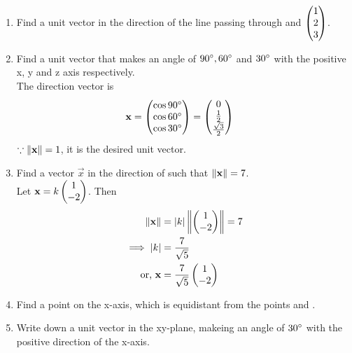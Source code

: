 \documentclass[journal,12pt,twocolumn]{IEEEtran}
\renewcommand\thesection{\arabic{section}}
\begin{document}
\begin{enumerate}[label=\thesection.\arabic*.,ref=\thesection.\theenumi]
%
%



\item Find a unit vector in the direction of the line passing through  and $\begin{pmatrix}1\\2\\3\end{pmatrix}$.
%
\\
\solution
%
\item Find a unit vector that makes an angle of $90\degree, 60\degree$ and $30\degree$ with the positive x, y and z axis respectively.
%
\\
\solution
The direction vector is
%
\begin{align}
\label{eq:line_dir_cos}
\mathbf{x} &= \begin{pmatrix}\cos 90\degree\\\cos 60\degree \\ \cos 30\degree\end{pmatrix} = \begin{pmatrix}0 \\ \frac{1}{2}\\\frac{\sqrt{3}}{2}\end{pmatrix}
\end{align}
%
$\because \left\lVert\mathbf{x}\right\rVert=1$, it is the desired unit vector.
\item Find a vector $\vec{x}$ in the direction of  such that $\left\lVert\mathbf{x}\right\rVert = 7$.
\\
\solution Let $\mathbf{x} = k\begin{pmatrix}1\\-2\end{pmatrix}$.  Then 
%
\begin{align}
\left\lVert\mathbf{x}\right\rVert &= \left\vert k\right\vert\left\lVert\begin{pmatrix}1\\-2\end{pmatrix}\right\rVert= 7
\\
\implies \left\vert k\right\vert &= \frac{7}{\sqrt{5}}
\\
\text{or, } \mathbf{x} &= \frac{7}{\sqrt{5}}\begin{pmatrix}1\\-2\end{pmatrix}
\end{align}
%
\item Find a point on the x-axis, which is equidistant from the points  and .
\\
\solution 
\item Write down a unit vector in the xy-plane, makeing an angle of $30\degree$ with the positive direction of the x-axis.
\\
\solution 


\end{enumerate}
\end{document}
